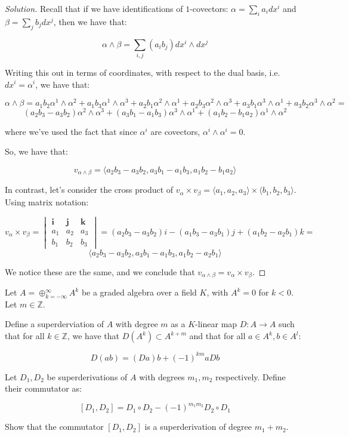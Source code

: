 \documentclass[10pt]{article}
\newenvironment{problem}[2][]{\begin{trivlist}
\item[\hskip \labelsep {\bfseries #1}\hskip \labelsep {\bfseries #2.}]}{\end{trivlist}}
\begin{document}
\begin{proof}[Solution]

Recall that if we have identifications of $1$-covectors: $\alpha = \sum_i a_i dx^i$ and $\beta = \sum_j b_j dx^j$, then we have that:

$$ \alpha \wedge \beta = \sum_{i,j} (a_i b_j) dx^i \wedge dx^j$$

Writing this out in terms of coordinates, with respect to the dual basis, i.e. $dx^i = \alpha^i$, we have that:

$$\alpha \wedge \beta = a_1 b_2 \alpha^1 \wedge \alpha^2 + a_1 b_3 \alpha^1 \wedge \alpha^3 + a_2 b_1 \alpha^2\wedge \alpha^1 + a_2 b_3 \alpha^2 \wedge \alpha^3 + a_3 b_1 \alpha^3 \wedge \alpha^1 + a_3 b_2 \alpha^3 \wedge \alpha^2 =$$
$$ (a_2b_3 - a_3b_2) \alpha^2 \wedge \alpha^3 + (a_3b_1 - a_1b_3) \alpha^3 \wedge \alpha^1 + (a_1b_2  - b_1a_2) \alpha^1\wedge \alpha^2 $$

where we've used the fact that since $\alpha^i$ are covectors, $\alpha^i \wedge \alpha^i = 0$.

So, we have that:

$$ v_{\alpha\wedge\beta} = \langle a_2b_3 - a_3b_2, a_3b_1  - a_1b_3, a_1b_2 - b_1a_2 \rangle $$

In contrast, let's consider the cross product of $v_\alpha \times v_\beta = \langle a_1, a_2, a_3 \rangle \times \langle b_1, b_2, b_3 \rangle $. Using matrix notation:

$$v_\alpha \times v_\beta = \begin{vmatrix} \mathbf{i}& \mathbf{j}  & \mathbf{k} \\ a_1  &a_2 &a_3 \\ b_1 & b_2 & b_3 \end{vmatrix} =  (a_2b_3 - a_3b_2)i - (a_1 b_3 - a_3 b_1)j + (a_1b_2 - a_2b_1)k =$$
$$ \langle a_2b_3 - a_3b_2, a_3b_1 - a_1b_3, a_1b_2 - a_2b_1 \rangle $$

We notice these are the same, and we conclude that $ v_{\alpha \wedge \beta} = v_\alpha \times v_\beta $.


\end{proof}

\begin{problem}{Question 4}

Let $A = \oplus_{k=-\infty}^\infty A^k$ be a graded algebra over a field $K$, with $A^k = 0$ for $k  < 0$. Let $m \in \mathbb{Z}$.

Define a superderviation of $A$ with degree $m$ as a $K$-linear map $D: A \to A$ such that for all $k \in \mathbb{Z}$, we have that $D(A^k) \subset A^{k+m}$ and that for all $a \in A^k, b \in A^l$:

$$D(ab) = (Da) b + (-1)^{km}a Db $$

Let $D_1, D_2$ be superderivations of $A$ with degrees $m_1, m_2$ respectively. Define their commutator as:

$$ [D_1, D_2] = D_1 \circ D_2 - (-1)^{m_1m_2} D_2 \circ D_1 $$

Show that the commutator $[D_1, D_2]$ is a superderivation of degree $m_1 + m_2$.

\end{problem}
\end{document}
